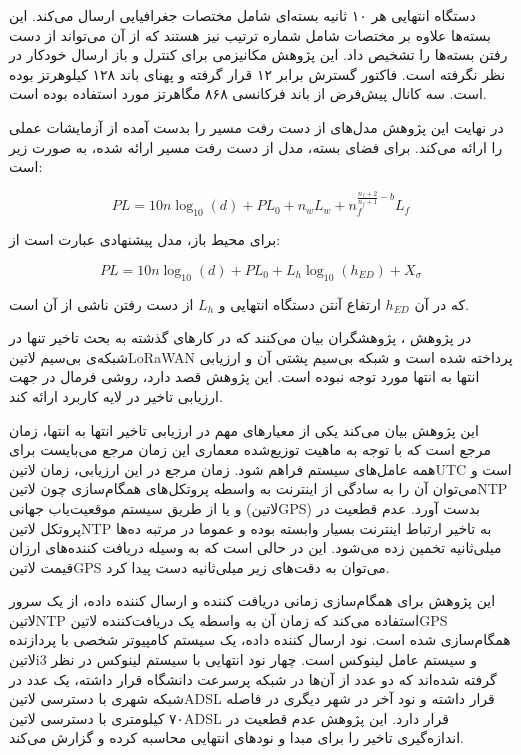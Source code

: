 دستگاه انتهایی هر ۱۰ ثانیه بسته‌ای شامل مختصات جغرافیایی ارسال می‌کند. این بسته‌ها علاوه بر مختصات شامل شماره ترتیب نیز هستند که از آن می‌تواند از دست رفتن بسته‌ها را تشخیص داد.
این پژوهش مکانیزمی برای کنترل و باز ارسال خودکار در نظر نگرفته است.
فاکتور گسترش برابر ۱۲ قرار گرفته و پهنای باند ۱۲۸ کیلوهرتز بوده است. سه کانال پیش‌فرض از باند فرکانسی ۸۶۸ مگاهرتز مورد استفاده بوده است.

در نهایت این پژوهش مدل‌های از دست رفت مسیر را بدست آمده از آزمایشات عملی را ارائه می‌کند. برای فضای بسته، مدل از دست رفت مسیر ارائه شده، به صورت زیر است:

\[
  PL = 10n\log_{10}(d) + PL_{0} + n_w L_w + n_f^{\frac{n_f+2}{n_f+1}-b}L_f
\]

برای محیط باز، مدل پیشنهادی عبارت است از:

\[
  PL = 10n\log_{10}(d) + PL_0 + L_h\log_{10}(h_{ED}) + X_{\sigma}
\]

که در آن $h_{ED}$ ارتفاع آنتن دستگاه انتهایی و $L_h$ از دست رفتن ناشی از آن است.


در پژوهش ، پژوهشگران بیان می‌کنند که در کارهای گذشته به بحث تاخیر تنها در شبکه‌ی بی‌سیم ‌لاتین{LoRaWAN} پرداخته شده است و شبکه بی‌سیم پشتی آن
و ارزیابی انتها به انتها مورد توجه نبوده است. این پژوهش قصد دارد، روشی فرمال در جهت ارزیابی تاخیر در لایه کاربرد ارائه کند.

این پژوهش بیان می‌کند یکی از معیارهای مهم در ارزیابی تاخیر انتها به انتها، زمان مرجع است که با توجه به ماهیت توزیع‌شده معماری این زمان مرجع می‌بایست برای همه عامل‌های
سیستم فراهم شود. زمان مرجع در این ارزیابی، زمان ‌لاتین{UTC} است و می‌توان آن را به سادگی از اینترنت به واسطه پروتکل‌های همگام‌سازی چون ‌لاتین{NTP}
و یا از طریق سیستم موقعیت‌یاب جهانی (‌لاتین{GPS}) بدست آورد.
عدم قطعیت در پروتکل ‌لاتین{NTP} به تاخیر ارتباط اینترنت بسیار وابسته بوده و عموما در مرتبه ده‌ها میلی‌ثانیه تخمین زده می‌شود.
این در حالی است که به وسیله دریافت کننده‌های ارزان قیمت ‌لاتین{GPS} می‌توان به دقت‌های زیر میلی‌ثانیه دست پیدا کرد.

این پژوهش برای همگام‌سازی زمانی دریافت کننده و ارسال کننده داده، از یک سرور ‌لاتین{NTP} استفاده می‌کند که زمان آن به واسطه یک دریافت‌کننده ‌لاتین{GPS} همگام‌سازی شده است.
نود ارسال کننده داده، یک سیستم کامپیوتر شخصی با پردازنده ‌لاتین{i3} و سیستم عامل لینوکس است. چهار نود انتهایی با سیستم لینوکس در نظر گرفته شده‌اند که دو عدد از آن‌ها در شبکه پرسرعت دانشگاه قرار داشته،
یک عدد در شبکه شهری با دسترسی ‌لاتین{ADSL} قرار داشته و نود آخر در شهر دیگری در فاصله ۷۰ کیلومتری با دسترسی ‌لاتین{ADSL} قرار دارد.
این پژوهش عدم قطعیت در اندازه‌گیری تاخیر را برای مبدا و نودهای انتهایی محاسبه کرده و گزارش می‌کند.

